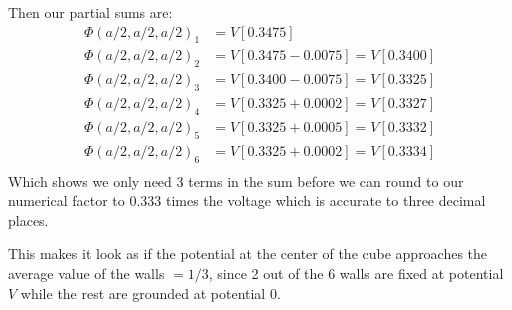 \documentclass{article}
\begin{document}
Then our partial sums are:
\begin{align*}
\Phi(a/2,a/2,a/2)_{1} &= V\left[ 0.3475 \right]\\
\Phi(a/2,a/2,a/2)_{2} &= V\left[ 0.3475 - 0.0075 \right] = V\left[ 0.3400 \right]\\
\Phi(a/2,a/2,a/2)_{3} &= V\left[ 0.3400 - 0.0075 \right] = V\left[ 0.3325 \right]\\
\Phi(a/2,a/2,a/2)_{4} &= V\left[ 0.3325 + 0.0002 \right] = V\left[ 0.3327 \right]\\
\Phi(a/2,a/2,a/2)_{5} &= V\left[ 0.3325 + 0.0005 \right] = V\left[ 0.3332 \right]\\
\Phi(a/2,a/2,a/2)_{6} &= V\left[ 0.3325 + 0.0002 \right] = V\left[ 0.3334 \right]\\
\end{align*}
Which shows we only need 3 terms in the sum before we can round to our numerical factor to 0.333 times the voltage which is accurate to three decimal places.

This makes it look as if the potential at the center of the cube approaches the average value of the walls $=1/3$, since 2 out of the 6 walls are fixed at potential $V$ while the rest are grounded at potential 0.
\end{document}
